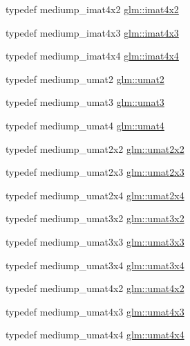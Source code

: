 \begin{DoxyCompactItemize}
\item 
typedef mediump\+\_\+imat4x2 \hyperlink{group__gtc__matrix__integer_ga7e733984837e0e7aa9f4aac18f632f63}{glm\+::imat4x2}
\item 
typedef mediump\+\_\+imat4x3 \hyperlink{group__gtc__matrix__integer_gaa4cca8e80c0603239eda452860063844}{glm\+::imat4x3}
\item 
typedef mediump\+\_\+imat4x4 \hyperlink{group__gtc__matrix__integer_ga367d8d5281ff82f1215a227dd2ea5ba9}{glm\+::imat4x4}
\item 
typedef mediump\+\_\+umat2 \hyperlink{group__gtc__matrix__integer_gae2d45c058cfa0b60ab4df0cdda2d8516}{glm\+::umat2}
\item 
typedef mediump\+\_\+umat3 \hyperlink{group__gtc__matrix__integer_ga8b8fbc858e28abf8fc344744f8d6d368}{glm\+::umat3}
\item 
typedef mediump\+\_\+umat4 \hyperlink{group__gtc__matrix__integer_ga7ae562000d8a8d193e9f93cf51e2e113}{glm\+::umat4}
\item 
typedef mediump\+\_\+umat2x2 \hyperlink{group__gtc__matrix__integer_gad3c997b31dd69bdb4787867e758ed48d}{glm\+::umat2x2}
\item 
typedef mediump\+\_\+umat2x3 \hyperlink{group__gtc__matrix__integer_ga890ae28f9230794138b2c89f44ce3376}{glm\+::umat2x3}
\item 
typedef mediump\+\_\+umat2x4 \hyperlink{group__gtc__matrix__integer_ga3b23b164240cf4dfb429776da7be9d88}{glm\+::umat2x4}
\item 
typedef mediump\+\_\+umat3x2 \hyperlink{group__gtc__matrix__integer_ga257300f2710612877ef45438a366e308}{glm\+::umat3x2}
\item 
typedef mediump\+\_\+umat3x3 \hyperlink{group__gtc__matrix__integer_gab80b6501ba1b2c40119a0f2d256f4c97}{glm\+::umat3x3}
\item 
typedef mediump\+\_\+umat3x4 \hyperlink{group__gtc__matrix__integer_ga5410857d098a989a30b4017100bc2ff7}{glm\+::umat3x4}
\item 
typedef mediump\+\_\+umat4x2 \hyperlink{group__gtc__matrix__integer_ga13e8392218e9b6e1b7f194a21b5c88bf}{glm\+::umat4x2}
\item 
typedef mediump\+\_\+umat4x3 \hyperlink{group__gtc__matrix__integer_ga08373f5588a54da1a48e5e55c7d51004}{glm\+::umat4x3}
\item 
typedef mediump\+\_\+umat4x4 \hyperlink{group__gtc__matrix__integer_gae0931b79e808fb0983848778a60eb548}{glm\+::umat4x4}
\end{DoxyCompactItemize}


